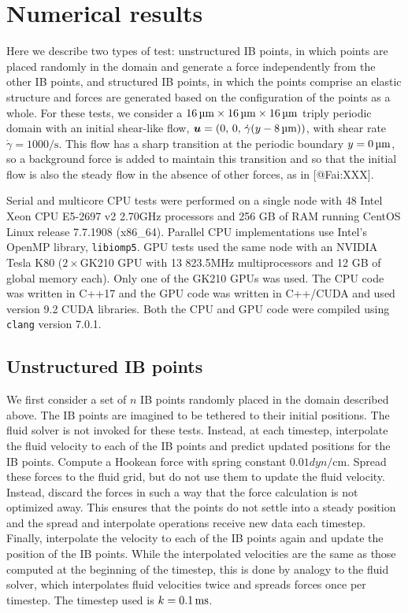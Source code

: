 \clearpage
\section{Numerical results}

Here we describe two types of test: unstructured IB points, in which points are
placed randomly in the domain and generate a force independently from the other
IB points, and structured IB points, in which the points comprise an elastic
structure and forces are generated based on the configuration of the points as
a whole. For these tests, we consider a $16\um\times16\um\times16\um$ triply
periodic domain with an initial shear-like flow,
$\vec{u} = (0,\,0,\,\dot{\gamma}(y-8\um))$, with shear rate
$\dot{\gamma} = 1000\si{\per\second}$. This flow has a sharp transition at the
periodic boundary $y=0\um$, so a background force is added to maintain this
transition and so that the initial flow is also the steady flow in the absence
of other forces, as in [@Fai:XXX].

Serial and multicore CPU tests were performed on a single node with 48
Intel\textsuperscript{\textregistered} Xeon\textsuperscript{\textregistered}
CPU E5-2697 v2 2.70\si{\giga\hertz} processors and 256 GB of RAM running CentOS
Linux release 7.7.1908 (x86\_64). Parallel CPU implementations use Intel's
OpenMP library, \texttt{libiomp5}. GPU tests used the same node with an
NVIDIA\textsuperscript{\textregistered} Tesla\textsuperscript{\textregistered}
K80 ($2\times$GK210 GPU with 13 823.5\si{\mega\hertz} multiprocessors and 12
GB of global memory each). Only one of the GK210 GPUs was used. The CPU code
was written in C++17 and the GPU code was written in C++/CUDA and used version
9.2 CUDA libraries. Both the CPU and GPU code were compiled using
\texttt{clang} version 7.0.1.

\subsection{Unstructured IB points}

We first consider a set of $n$ IB points randomly placed in the domain
described above. The IB points are imagined to be tethered to their initial
positions. The fluid solver is not invoked for these tests. Instead, at each
timestep, interpolate the fluid velocity to each of the IB points and predict
updated positions for the IB points. Compute a Hookean force with spring
constant $0.01\si{dyn\per\centi\meter}$. Spread these forces to the fluid grid,
but do not use them to update the fluid velocity. Instead, discard the forces
in such a way that the force calculation is not optimized away. This ensures
that the points do not settle into a steady position and the spread and
interpolate operations receive new data each timestep. Finally, interpolate the
velocity to each of the IB points again and update the position of the IB
points. While the interpolated velocities are the same as those computed at the
beginning of the timestep, this is done by analogy to the fluid solver, which
interpolates fluid velocities twice and spreads forces once per timestep. The
timestep used is $k = 0.1\ms$.

